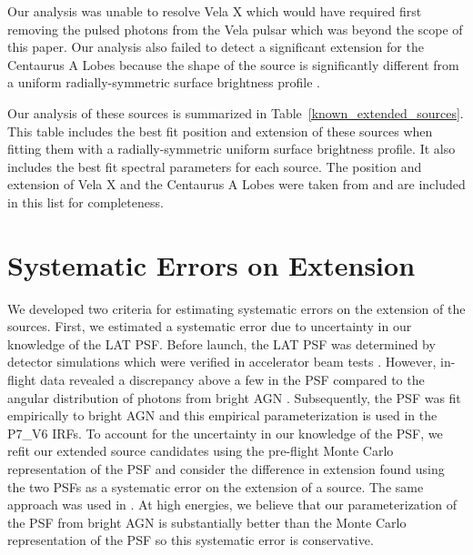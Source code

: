 \documentclass[12pt,preprint]{aastex}
\newcommand{\gev}{\text{GeV}\xspace}
\begin{document}
Our analysis was unable to resolve Vela X which would have required first
removing the pulsed photons from the Vela pulsar which was beyond the
scope of this paper.  Our analysis also failed to detect a significant
extension for the Centaurus A Lobes because
the shape of the source is significantly different from a uniform
radially-symmetric surface brightness profile \citep{cen_a_lat}.

Our analysis of these sources is summarized in
Table~\ref{known_extended_sources}.  This table includes the best fit
position and extension of these sources when fitting them 
with a radially-symmetric uniform surface brightness profile. It also
includes the best fit spectral parameters for each source.  The position
and extension of Vela X and the Centaurus A Lobes were taken from
\cite{velax,cen_a_lat} and are included in this list for completeness.

\section{Systematic Errors on Extension}
\label{systematic_errors_on_extension}


We developed two criteria for estimating systematic errors
on the extension of the sources.
First, we estimated a systematic error due to
uncertainty in our knowledge of the LAT PSF.  
Before launch, the LAT PSF
was determined by detector simulations which were verified in accelerator
beam tests \citep{atwood_LAT_mission}. However, in-flight data revealed
a discrepancy above a few \gev in the PSF compared to the angular
distribution of photons from bright AGN \citep{lat_on_orbit_psf}.
Subsequently, the PSF was fit empirically to bright AGN and this
empirical parameterization is used in the P7\_V6 IRFs.  To account for
the uncertainty in our knowledge of the PSF, we refit our extended source
candidates using the pre-flight Monte Carlo representation of the PSF
and consider the difference in extension found using the two PSFs as a
systematic error on the extension of a source.  The same approach was used
in \cite{ic443}.  At high energies, we believe that our parameterization
of the PSF from bright AGN is substantially better than the Monte Carlo
representation of the PSF so this systematic error is conservative.

\end{document}
